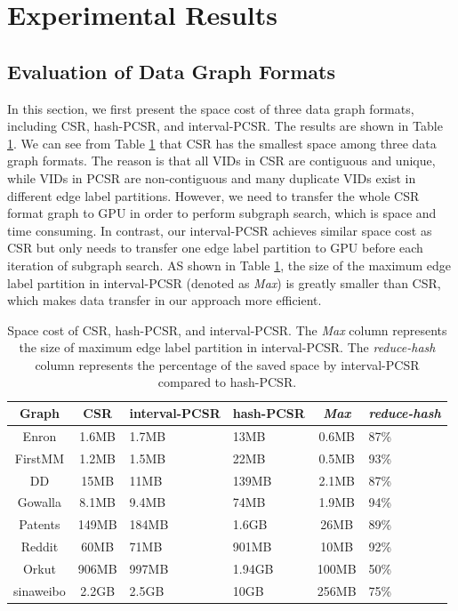 \section{Experimental Results}


\subsection{Evaluation of Data Graph Formats}
In this section, we first present the space cost of three data graph formats, including CSR, hash-PCSR, and  interval-PCSR. The results are
shown in Table \ref{tab:graphsize}. We can see from Table \ref{tab:graphsize} that CSR has the smallest space among three data graph
formats. The reason is that all VIDs in CSR are contiguous and unique, while VIDs in PCSR are non-contiguous and many duplicate VIDs exist
in different edge label partitions. However, we need to transfer the whole CSR format graph to GPU in order to perform subgraph search,
which is space and time consuming. In contrast, our interval-PCSR achieves similar space cost as CSR but only needs to transfer one edge
label partition to GPU before each iteration of subgraph search. AS shown in Table \ref{tab:graphsize}, the size of the maximum edge label
partition in interval-PCSR (denoted as \emph{Max}) is greatly smaller than CSR, which makes data transfer in our approach more efficient.


\begin{table}
\centering
  \caption{Space cost of CSR, hash-PCSR, and interval-PCSR. The \emph{Max} column represents the size of maximum edge label partition in interval-PCSR. The \emph{reduce-hash} column represents the percentage of the saved space by interval-PCSR compared to hash-PCSR.}
  \label{tab:graphsize}
  \begin{tabular}{ccp{30pt}p{30pt}cp{30pt}}
  \hline
    Graph &CSR&interval-PCSR&hash-PCSR&\emph{Max}&\emph{reduce-hash}\\
    \hline
    Enron 		&1.6MB	&1.7MB	&13MB	&0.6MB	&87\% \\
    FirstMM 	&1.2MB	&1.5MB	&22MB	&0.5MB	&93\% \\
    DD 			&15MB	&11MB	&139MB	&2.1MB	&87\% \\
    Gowalla 	&8.1MB	&9.4MB	&74MB	&1.9MB	&94\% \\
    Patents 	&149MB	&184MB	&1.6GB	&26MB	&89\% \\
    Reddit 		&60MB	&71MB	&901MB	&10MB	&92\% \\
    Orkut 		&906MB	&997MB	&1.94GB	&100MB	&50\% \\
    sinaweibo	&2.2GB	&2.5GB	&10GB	&256MB	&75\% \\

    \hline
  \end{tabular}
\end{table}

